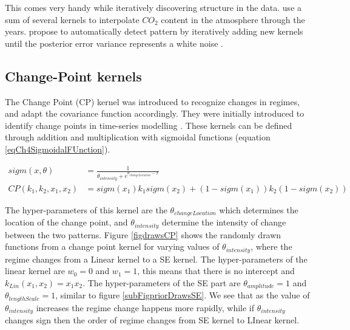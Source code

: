 This comes very handy while iteratively discovering structure in the data. \cite{Rasmussen2005} use a sum of several kernels to interpolate $CO_{2}$ content in the atmosphere through the years. \cite{automaticStatistician} propose to automatically detect pattern by iteratively adding new kernels until the posterior error variance represents a white noise . 

\subsection{Change-Point kernels}\label{subSecCh4CPKernel}
The Change Point (CP) kernel was introduced to recognize changes in regimes, and adapt the covariance function accordingly. They were initially introduced to identify change points in time-series modelling \cite{osborne2010bayesian, saatcci2010gaussian}. These kernels can be defined through addition and multiplication with sigmoidal functions (equation \ref{eqCh4SigmoidalFUnction}). 

\begin{align}
sigm(x, \theta) & = \frac{1}{\theta_{intensity} + e^{\theta_{changeLocation}-x}} \label{eqCh4SigmoidalFUnction} \\
CP(k_{1}, k_{2}, x_{1}, x_{2}) & = sigm(x_{1})k_{1}sigm(x_{2}) + (1-sigm(x_{1}))k_{2}(1-sigm(x_{2})) \label{eq:changePointKernel}
\end{align}

The hyper-parameters of this kernel are the $\theta_{changeLocation}$ which determines the location of the change point, and $\theta_{intensity}$ determine the intensity of change between the two patterns. Figure \ref{figdrawsCP} shows the randomly drawn functions from a change point kernel for varying values of $\theta_{intensity}$, where the regime changes from a Linear kernel to a SE kernel. The hyper-parameters of the linear kernel are $w_{0}=0$ and $w_{1}=1$, this means that there is no intercept and $k_{Lin}(x_{1}, x_{2}) = x_{1}x_{2}$. The hyper-parameters of the SE part are $\theta_{amplitude}=1$ and $\theta_{lengthScale}=1$, similar to figure \ref{subFigpriorDrawsSE}. We see that as the value of $\theta_{intensity}$ increases the regime change happens more rapidly, while if $\theta_{intensity}$ changes sign then the order of regime changes from SE kernel to LInear kernel.


